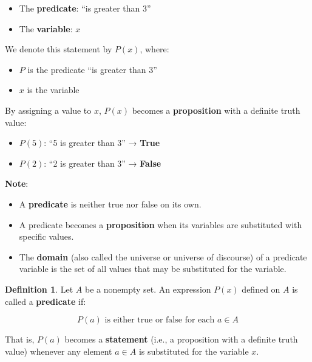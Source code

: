 \documentclass[
]{book}
\providecommand{\tightlist}{%
  \setlength{\itemsep}{0pt}\setlength{\parskip}{0pt}}
\theoremstyle{definition}
\newtheorem{definition}{Definition}[chapter]
\theoremstyle{definition}
\theoremstyle{definition}
\theoremstyle{definition}
\theoremstyle{remark}
\begin{document}
\begin{itemize}
\tightlist
\item
  The \textbf{predicate}: ``is greater than 3''
\item
  The \textbf{variable}: \(x\)
\end{itemize}

We denote this statement by \(P(x)\), where:

\begin{itemize}
\tightlist
\item
  \(P\) is the predicate ``is greater than 3''
\item
  \(x\) is the variable
\end{itemize}

By assigning a value to \(x\), \(P(x)\) becomes a \textbf{proposition} with a definite truth value:

\begin{itemize}
\tightlist
\item
  \(P(5)\): ``5 is greater than 3'' → \textbf{True}
\item
  \(P(2)\): ``2 is greater than 3'' → \textbf{False}
\end{itemize}

\textbf{Note}:

\begin{itemize}
\tightlist
\item
  A \textbf{predicate} is neither true nor false on its own.
\item
  A predicate becomes a \textbf{proposition} when its variables are substituted with specific values.
\item
  The \textbf{domain} (also called the universe or universe of discourse) of a predicate variable is the set of all values that may be substituted for the variable.
\end{itemize}

\begin{definition}
\protect\hypertarget{def:unnamed-chunk-42}{}\label{def:unnamed-chunk-42}Let \(A\) be a nonempty set. An expression \(P(x)\) defined on \(A\) is called a \textbf{predicate} if:

\[
P(a) \text{ is either true or false for each } a \in A
\]

That is, \(P(a)\) becomes a \textbf{statement} (i.e., a proposition with a definite truth value) whenever any element \(a \in A\) is substituted for the variable \(x\).
\end{definition}
\end{document}
